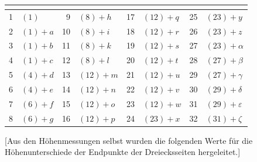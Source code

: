 {\centering
\setlength{\tabcolsep}{.57em}
\begin{tabular}{|r|l||r|l||r|l||r|l|}
&
&
&
&
&
&
&
\\[3pt]
 & \((1)\) & 9 & \((8)+h\) & 17 & \((12)+q\) & 25 & \((23)+y\)\\
2 & \((1)+a\) & 10 & \((8)+i\) & 18 & \((12)+r\) & 26 & \((23)+z\)\\
3 & \((1)+b\) & 11 & \((8)+k\) & 19 & \((12)+s\) & 27 & \((23)+\alpha\)\\
4 & \((1)+c\) & 12 & \((8)+l\) & 20 & \((12)+t\) & 28 & \((27)+\beta\)\\
5 & \((4)+d\) & 13 & \((12)+m\) & 21 & \((12)+u\) & 29 & \((27)+\gamma\)\\
6 & \((4)+e\) & 14 & \((12)+n\) & 22 & \((12)+v\) & 30 & \((29)+\delta\)\\
7 & \((6)+f\) & 15 & \((12)+o\) & 23 & \((12)+w\) & 31 & \((29)+\varepsilon\)\\
8 & \((6)+g\) & 16 & \((12)+p\) & 24 & \((23)+x\) & 32 & \((31)+\zeta\)\\
\end{tabular}\par}

\par\medskip
\par\noindent\hspace*{\parindent}[Aus den Höhenmessungen selbst wurden die folgenden Werte für die
Höhenunterschiede der Endpunkte der Dreiecksseiten hergeleitet.]


